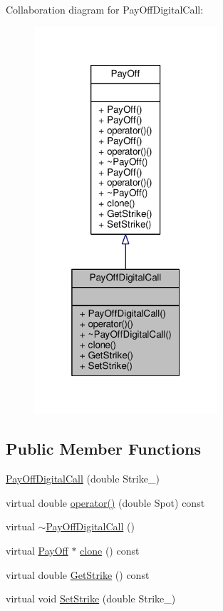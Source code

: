 Collaboration diagram for Pay\+Off\+Digital\+Call\+:
\nopagebreak
\begin{figure}[H]
\begin{center}
\leavevmode
\includegraphics[width=193pt]{classPayOffDigitalCall__coll__graph}
\end{center}
\end{figure}
\subsection*{Public Member Functions}
\begin{DoxyCompactItemize}
\item 
\hyperlink{classPayOffDigitalCall_a1fb26646cdb8544a4c8229161f38c12d}{Pay\+Off\+Digital\+Call} (double Strike\+\_\+)
\item 
virtual double \hyperlink{classPayOffDigitalCall_a719ac152051a88a7a6a34d2431bc15b0}{operator()} (double Spot) const
\item 
virtual \hyperlink{classPayOffDigitalCall_a82b3274804a29c90b1df3f3dcef7dfa1}{$\sim$\+Pay\+Off\+Digital\+Call} ()
\item 
virtual \hyperlink{classPayOff}{Pay\+Off} $\ast$ \hyperlink{classPayOffDigitalCall_a442824c18722ef620a6d4ac884cd39be}{clone} () const
\item 
virtual double \hyperlink{classPayOffDigitalCall_ad8953d367e291925ab5d963f57ed35bc}{Get\+Strike} () const
\item 
virtual void \hyperlink{classPayOffDigitalCall_a9f491f0704d09a233af8bb49c4eaed9e}{Set\+Strike} (double Strike\+\_\+)
\end{DoxyCompactItemize}
